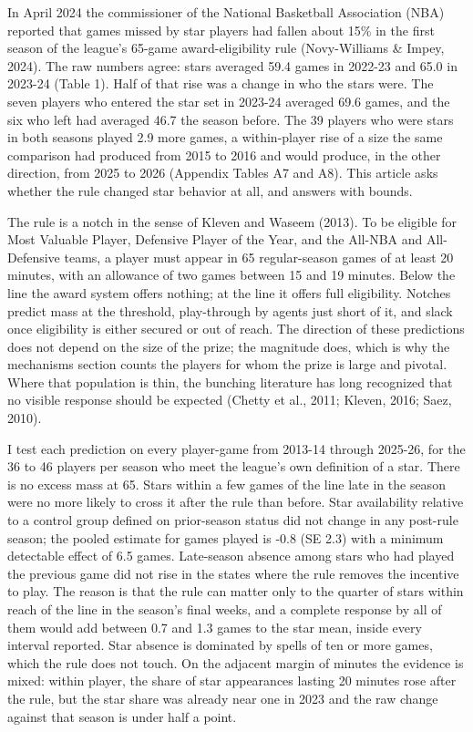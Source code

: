 \documentclass[12pt]{article}
\begin{document}
In April 2024 the commissioner of the National Basketball Association (NBA) reported that games missed by star players had fallen about 15\% in the first season of the league's 65-game award-eligibility rule (Novy-Williams \& Impey, 2024). The raw numbers agree: stars averaged 59.4 games in 2022-23 and 65.0 in 2023-24 (Table 1). Half of that rise was a change in who the stars were. The seven players who entered the star set in 2023-24 averaged 69.6 games, and the six who left had averaged 46.7 the season before. The 39 players who were stars in both seasons played 2.9 more games, a within-player rise of a size the same comparison had produced from 2015 to 2016 and would produce, in the other direction, from 2025 to 2026 (Appendix Tables A7 and A8). This article asks whether the rule changed star behavior at all, and answers with bounds.

The rule is a notch in the sense of Kleven and Waseem (2013). To be eligible for Most Valuable Player, Defensive Player of the Year, and the All-NBA and All-Defensive teams, a player must appear in 65 regular-season games of at least 20 minutes, with an allowance of two games between 15 and 19 minutes. Below the line the award system offers nothing; at the line it offers full eligibility. Notches predict mass at the threshold, play-through by agents just short of it, and slack once eligibility is either secured or out of reach. The direction of these predictions does not depend on the size of the prize; the magnitude does, which is why the mechanisms section counts the players for whom the prize is large and pivotal. Where that population is thin, the bunching literature has long recognized that no visible response should be expected (Chetty et al., 2011; Kleven, 2016; Saez, 2010).

I test each prediction on every player-game from 2013-14 through 2025-26, for the 36 to 46 players per season who meet the league's own definition of a star. There is no excess mass at 65. Stars within a few games of the line late in the season were no more likely to cross it after the rule than before. Star availability relative to a control group defined on prior-season status did not change in any post-rule season; the pooled estimate for games played is -0.8 (SE 2.3) with a minimum detectable effect of 6.5 games. Late-season absence among stars who had played the previous game did not rise in the states where the rule removes the incentive to play. The reason is that the rule can matter only to the quarter of stars within reach of the line in the season's final weeks, and a complete response by all of them would add between 0.7 and 1.3 games to the star mean, inside every interval reported. Star absence is dominated by spells of ten or more games, which the rule does not touch. On the adjacent margin of minutes the evidence is mixed: within player, the share of star appearances lasting 20 minutes rose after the rule, but the star share was already near one in 2023 and the raw change against that season is under half a point.
\end{document}
